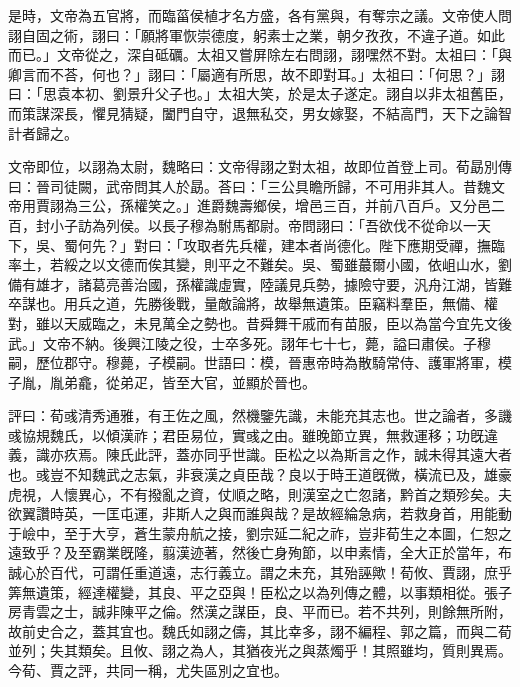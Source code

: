 \begin{pinyinscope}
是時，文帝為五官將，而臨菑侯植才名方盛，各有黨與，有奪宗之議。文帝使人問詡自固之術，詡曰：「願將軍恢崇德度，躬素士之業，朝夕孜孜，不違子道。如此而已。」文帝從之，深自砥礪。太祖又嘗屏除左右問詡，詡嘿然不對。太祖曰：「與卿言而不荅，何也？」詡曰：「屬適有所思，故不即對耳。」太祖曰：「何思？」詡曰：「思袁本初、劉景升父子也。」太祖大笑，於是太子遂定。詡自以非太祖舊臣，而策謀深長，懼見猜疑，闔門自守，退無私交，男女嫁娶，不結高門，天下之論智計者歸之。

文帝即位，以詡為太尉，魏略曰：文帝得詡之對太祖，故即位首登上司。荀勗別傳曰：晉司徒闕，武帝問其人於勗。荅曰：「三公具瞻所歸，不可用非其人。昔魏文帝用賈詡為三公，孫權笑之。」進爵魏壽鄉侯，增邑三百，并前八百戶。又分邑二百，封小子訪為列侯。以長子穆為駙馬都尉。帝問詡曰：「吾欲伐不從命以一天下，吳、蜀何先？」對曰：「攻取者先兵權，建本者尚德化。陛下應期受禪，撫臨率土，若綏之以文德而俟其變，則平之不難矣。吳、蜀雖蕞爾小國，依岨山水，劉備有雄才，諸葛亮善治國，孫權識虛實，陸議見兵勢，據險守要，汎舟江湖，皆難卒謀也。用兵之道，先勝後戰，量敵論將，故舉無遺策。臣竊料羣臣，無備、權對，雖以天威臨之，未見萬全之勢也。昔舜舞干戚而有苗服，臣以為當今宜先文後武。」文帝不納。後興江陵之役，士卒多死。詡年七十七，薨，謚曰肅侯。子穆嗣，歷位郡守。穆薨，子模嗣。世語曰：模，晉惠帝時為散騎常侍、護軍將軍，模子胤，胤弟龕，從弟疋，皆至大官，並顯於晉也。

評曰：荀彧清秀通雅，有王佐之風，然機鑒先識，未能充其志也。世之論者，多譏彧協規魏氏，以傾漢祚；君臣易位，實彧之由。雖晚節立異，無救運移；功旣違義，識亦疚焉。陳氏此評，蓋亦同乎世識。臣松之以為斯言之作，誠未得其遠大者也。彧豈不知魏武之志氣，非衰漢之貞臣哉？良以于時王道旣微，橫流已及，雄豪虎視，人懷異心，不有撥亂之資，仗順之略，則漢室之亡忽諸，黔首之類殄矣。夫欲翼讚時英，一匡屯運，非斯人之與而誰與哉？是故經綸急病，若救身首，用能動于嶮中，至于大亨，蒼生蒙舟航之接，劉宗延二紀之祚，豈非荀生之本圖，仁恕之遠致乎？及至霸業旣隆，翦漢迹著，然後亡身殉節，以申素情，全大正於當年，布誠心於百代，可謂任重道遠，志行義立。謂之未充，其殆誣歟！荀攸、賈詡，庶乎筭無遺策，經達權變，其良、平之亞與！臣松之以為列傳之體，以事類相從。張子房青雲之士，誠非陳平之倫。然漢之謀臣，良、平而已。若不共列，則餘無所附，故前史合之，蓋其宜也。魏氏如詡之儔，其比幸多，詡不編程、郭之篇，而與二荀並列；失其類矣。且攸、詡之為人，其猶夜光之與蒸燭乎！其照雖均，質則異焉。今荀、賈之評，共同一稱，尤失區別之宜也。


\end{pinyinscope}